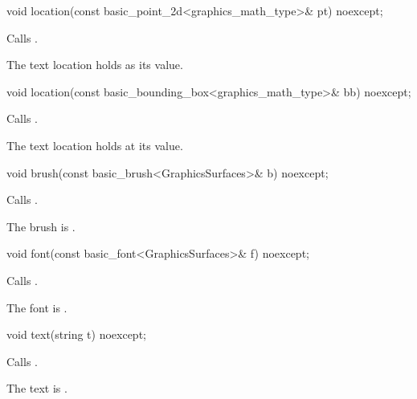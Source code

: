 %
\begin{itemdecl}
void location(const basic_point_2d<graphics_math_type>& pt) noexcept;
\end{itemdecl}
\begin{itemdescr}
\pnum
\effects Calls .

\pnum
\remarks The text location holds  as its value.
\end{itemdescr}

%
\begin{itemdecl}
void location(const basic_bounding_box<graphics_math_type>& bb) noexcept;
\end{itemdecl}
\begin{itemdescr}
\pnum
\effects Calls .

\pnum
\remarks The text location holds  at its value.
\end{itemdescr}

%
\begin{itemdecl}
void brush(const basic_brush<GraphicsSurfaces>& b) noexcept;
\end{itemdecl}
\begin{itemdescr}
\pnum
\effects Calls .

\pnum
\remarks The brush is .
\end{itemdescr}

%
\begin{itemdecl}
void font(const basic_font<GraphicsSurfaces>& f) noexcept;
\end{itemdecl}
\begin{itemdescr}
\pnum
\effects Calls .

\pnum
\remarks The font is .
\end{itemdescr}

%
\begin{itemdecl}
void text(string t) noexcept;
\end{itemdecl}
\begin{itemdescr}
\pnum
\effects Calls .

\pnum
\remarks The text is .
\end{itemdescr}

